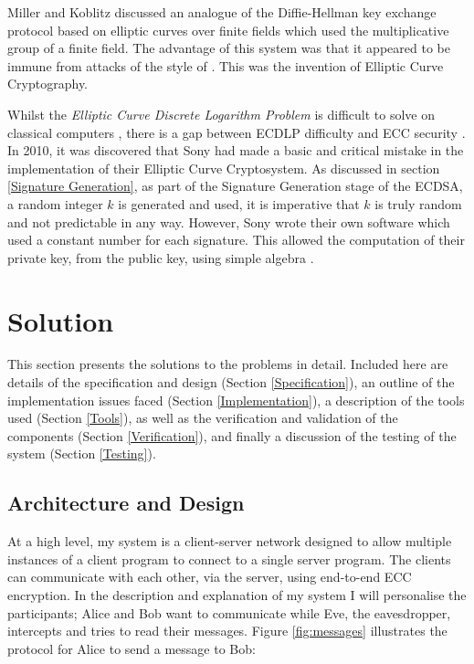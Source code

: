\documentclass[12pt,a4paper]{article}
\begin{document}
Miller \citeyear{10.1007/3-540-39799-X_31} and Koblitz \citeyear{koblitz1987elliptic} discussed an analogue of the Diffie-Hellman key exchange protocol based on elliptic curves over finite fields which used the multiplicative group of a finite field. 
The advantage of this system was that it appeared to be immune from attacks of the style of \cite{10.1007/3-540-39799-X_31,4568001}. 
This was the invention of Elliptic Curve Cryptography. 

Whilst the \emph{Elliptic Curve Discrete Logarithm Problem} is difficult to solve on classical computers \cite{hankerson2003guide}, 
there is a gap between ECDLP difficulty and ECC security \cite{bernstein2013safecurves}. 
In 2010, it was discovered that Sony had made a basic and critical mistake in the implementation of their Elliptic Curve Cryptosystem. 
As discussed in section \ref{Signature Generation}, as part of the Signature Generation stage of the ECDSA, a random integer $k$ is generated and used, 
it is imperative that $k$ is truly random and not predictable in any way. 
However, Sony wrote their own software which used a constant number for each signature. 
This allowed the computation of their private key, from the public key, using simple algebra \cite{hotz2010console}.


\section{Solution}\noindent
This section presents the solutions to the problems in detail. 
Included here are details of the specification and design (Section \ref{Specification}), 
an outline of the implementation issues faced (Section \ref{Implementation}), 
a description of the tools used (Section \ref{Tools}), 
as well as the verification and validation of the components (Section \ref{Verification}), 
and finally a discussion of the testing of the system (Section \ref{Testing}). 

\subsection{Architecture and Design}\noindent \label{Specification}
At a high level, my system is a client-server network designed to allow 
multiple instances of a client program to connect to a single server program. 
The clients can communicate with each other, via the server, using end-to-end ECC encryption. 
In the description and explanation of my system I will personalise the participants; 
Alice and Bob want to communicate while Eve, the eavesdropper, intercepts and tries to read their messages. 
Figure \ref{fig:messages} illustrates the protocol for Alice to send a message to Bob: 
\end{document}
